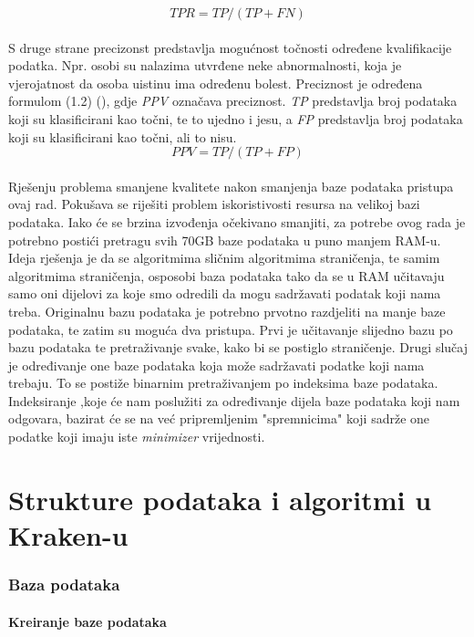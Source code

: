 \documentclass[times, utf8, zavrsni]{fer}
\begin{document}
\begin{equation}
TPR = TP / (TP + FN)
\end{equation}
\\S druge strane precizonst predstavlja mogućnost točnosti određene kvalifikacije podatka. Npr. osobi su nalazima utvrđene neke abnormalnosti, koja je vjerojatnost da osoba uistinu ima određenu bolest. Preciznost je određena formulom (1.2) (\cite{Definicija}), gdje \textit{PPV} označava preciznost. \textit{TP} predstavlja broj podataka koji su klasificirani kao točni, te to ujedno i jesu, a \textit{FP} predstavlja broj podataka koji su klasificirani kao točni, ali to nisu.
\begin{equation}
PPV = TP / (TP + FP)
\end{equation}
\\Rješenju problema smanjene kvalitete nakon smanjenja baze podataka pristupa ovaj rad. Pokušava se riješiti problem iskoristivosti resursa na velikoj bazi podataka. Iako će se brzina izvođenja očekivano smanjiti, za potrebe ovog rada je potrebno postići pretragu svih 70GB baze podataka u puno manjem RAM-u. Ideja rješenja je da se algoritmima sličnim algoritmima straničenja, te samim algoritmima straničenja, osposobi baza podataka tako da se u RAM učitavaju samo oni dijelovi za koje smo odredili da mogu sadržavati podatak koji nama treba. Originalnu bazu podataka je potrebno prvotno razdjeliti na manje baze podataka, te zatim su moguća dva pristupa. Prvi je učitavanje slijedno bazu po bazu podataka te pretraživanje svake, kako bi se postiglo straničenje. Drugi slučaj je određivanje one baze podataka koja može sadržavati podatke koji nama trebaju. To se postiže binarnim pretraživanjem po indeksima baze podataka. Indeksiranje ,koje će nam poslužiti za određivanje dijela baze podataka koji nam odgovara, bazirat će se na već pripremljenim "spremnicima" koji sadrže one podatke koji imaju iste \textit{minimizer} vrijednosti. 


\chapter{Strukture podataka i algoritmi u Kraken-u}
\subsection{Baza podataka}
\subsubsection{Kreiranje baze podataka}
\end{document}
